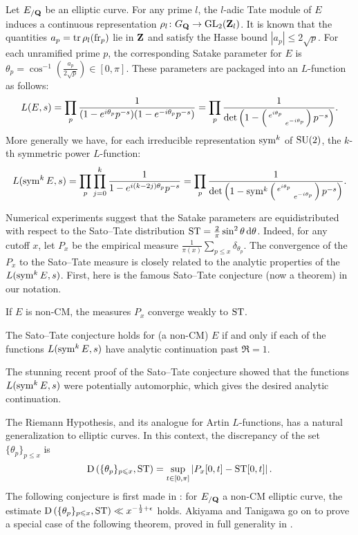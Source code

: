 Let $E_{/\mathbf{Q}}$ be an elliptic curve. For any prime $l$, the $l$-adic Tate 
module of $E$ induces a continuous representation 
$\rho_l \colon G_{\mathbf{Q}} \to \operatorname{GL}_2(\mathbf{Z}_l)$. It is known that the quantities 
$a_p = \operatorname{tr} \rho_l(\mathrm{fr}_p)$ lie in $\mathbf{Z}$ and satisfy the Hasse bound 
$|a_p| \leqslant 2\sqrt p$. For each unramified prime $p$, the 
corresponding Satake parameter for $E$ is 
$\theta_p = \cos^{-1}\left(\frac{a_p}{2\sqrt p}\right) \in [0,\pi]$. 
These parameters are packaged into an $L$-function as follows:
\[
	L(E,s) = \prod_p \frac{1}{(1 - e^{i \theta_p} p^{-s})(1- e^{-i \theta_p} p^{-s})} = \prod_p \frac{1}{\det\left(1 - \left(\begin{smallmatrix} e^{i\theta_p} &  \\  & e^{-i \theta_p} \end{smallmatrix}\right)p^{-s}\right)}.
\]
More generally we have, for each irreducible representation $\operatorname{sym}^k$ of 
$\operatorname{SU}(2)$, the $k$-th symmetric power $L$-function: 
\[
	L(\operatorname{sym}^k E, s) = \prod_p \prod_{j=0}^k \frac{1}{1 - e^{i (k - 2j) \theta_p} p^{-s}} = \prod_p \frac{1}{\det\left(1-\operatorname{sym}^k \left(\begin{smallmatrix} e^{i\theta_p} &  \\  & e^{-i \theta_p} \end{smallmatrix}\right)p^{-s}\right)}.
\]

Numerical experiments suggest that the Satake parameters are equidistributed 
with respect to the Sato--Tate distribution 
$\mathrm{ST} = \frac{2}{\pi} \sin^2\theta\, \mathrm{d}\theta$. Indeed, for any cutoff $x$, let 
$P_x$ be the empirical measure 
$\frac{1}{\pi(x)} \sum_{p\leqslant x} \delta_{\theta_p}$. 
The convergence of the $P_x$ to the Sato--Tate measure is closely related to 
the analytic properties of the $L(\operatorname{sym}^k E,s)$. First, here is the famous 
Sato--Tate conjecture (now a theorem) in our notation. 

\begin{theorem}[Taylor et.~al.]
If $E$ is non-CM, the measures $P_x$ converge weakly to $\mathrm{ST}$. 
\end{theorem}

\begin{theorem}[Serre]
The Sato--Tate conjecture holds for (a non-CM) $E$ if and only if each of 
the functions $L(\operatorname{sym}^k E,s)$ have analytic continuation past $\Re = 1$. 
\end{theorem}

The stunning recent proof of the Sato--Tate conjecture 
\cite{clozel-harris-taylor-2008,taylor-2008,harris-shepherd-barron-taylor-2010} 
showed that the functions $L(\operatorname{sym}^k E,s)$ were potentially automorphic, 
which gives the desired analytic continuation. 

The Riemann Hypothesis, and its analogue for Artin $L$-functions, has a natural 
generalization to elliptic curves. In this context, the discrepancy of the set 
$\{\theta_p\}_{p\leqslant x}$ is 
\[
	\operatorname{D}\left(\{\theta_p\}_{p\leqslant x},\mathrm{ST}\right) = \sup_{t\in [0,\pi]} \left| P_x[0,t] - \mathrm{ST}[0,t]\right| .
\]
The following conjecture is first made in \cite{akiyama-tanigawa-1999}: for 
$E_{/\mathbf{Q}}$ a non-CM elliptic curve, the estimate 
$\operatorname{D}\left(\{\theta_p\}_{p\leqslant x},\mathrm{ST}\right)\ll x^{-\frac 1 2+\epsilon}$ 
holds. Akiyama and Tanigawa go on to prove a special case of the following 
theorem, proved in full generality in \cite{mazur-2008}. 

